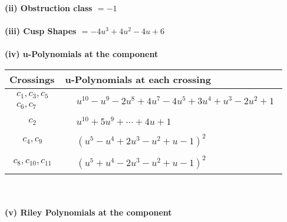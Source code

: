 \documentclass[1p]{elsarticle_modified}
\theoremstyle{definition}
\begin{document}
\flushleft \textbf{(ii) Obstruction class $= -1$}\\~\\
\flushleft \textbf{(iii) Cusp Shapes $= -4 u^3+4 u^2-4 u+6$}\\~\\
\newpage\renewcommand{\arraystretch}{1}
\flushleft \textbf{(iv) u-Polynomials at the component}\newline \\
\begin{tabular}{m{50pt}|m{274pt}}
Crossings & \hspace{64pt}u-Polynomials at each crossing \\
\hline $$\begin{aligned}c_{1},c_{3},c_{5}\\c_{6},c_{7}\end{aligned}$$&$\begin{aligned}
&u^{10}- u^9-2 u^8+4 u^7-4 u^5+3 u^4+u^3-2 u^2+1
\end{aligned}$\\
\hline $$\begin{aligned}c_{2}\end{aligned}$$&$\begin{aligned}
&u^{10}+5 u^9+\cdots+4 u+1
\end{aligned}$\\
\hline $$\begin{aligned}c_{4},c_{9}\end{aligned}$$&$\begin{aligned}
&(u^5- u^4+2 u^3- u^2+u-1)^2
\end{aligned}$\\
\hline $$\begin{aligned}c_{8},c_{10},c_{11}\end{aligned}$$&$\begin{aligned}
&(u^5+u^4-2 u^3- u^2+u-1)^2
\end{aligned}$\\
\hline
\end{tabular}\\~\\
\newpage\renewcommand{\arraystretch}{1}
\flushleft \textbf{(v) Riley Polynomials at the component}\newline \\
\end{document}
